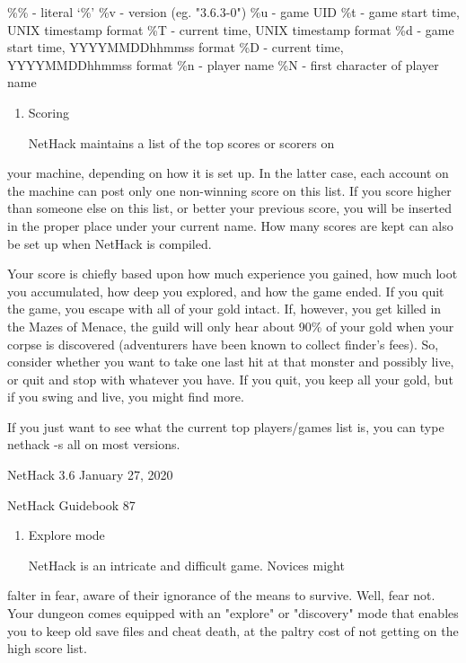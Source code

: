\documentclass[11pt]{article}
\begin{document}
\%\% - literal `\%'
\%v - version (eg. "3.6.3-0")
\%u - game UID
\%t - game start time, UNIX timestamp format
\%T - current time, UNIX timestamp format
\%d - game start time, YYYYMMDDhhmmss format
\%D - current time, YYYYMMDDhhmmss format
\%n - player name
\%N - first character of player name

\begin{enumerate}
\item Scoring

NetHack maintains a list of the top scores or scorers on
\end{enumerate}
your machine, depending on how it is set up. In the latter case,
each account on the machine can post only one non-winning score
on this list.  If you score higher than someone else on this
list, or better your previous score, you will be inserted in the
proper place under your current name. How many scores are kept
can also be set up when NetHack is compiled.

   Your score is chiefly based upon how much experience you
gained, how much loot you accumulated, how deep you explored, and
how the game ended. If you quit the game, you escape with all of
your gold intact.  If, however, you get killed in the Mazes of
Menace, the guild will only hear about 90\% of your gold when your
corpse is discovered (adventurers have been known to collect
finder's fees). So, consider whether you want to take one last
hit at that monster and possibly live, or quit and stop with
whatever you have. If you quit, you keep all your gold, but if
you swing and live, you might find more.

   If you just want to see what the current top players/games
list is, you can type nethack -s all on most versions.






NetHack 3.6                   January 27, 2020





NetHack Guidebook                       87



\begin{enumerate}
\item Explore mode

NetHack is an intricate and difficult game.  Novices might
\end{enumerate}
falter in fear, aware of their ignorance of the means to survive.
Well, fear not. Your dungeon comes equipped with an "explore" or
"discovery" mode that enables you to keep old save files and
cheat death, at the paltry cost of not getting on the high score
list.
\end{document}
